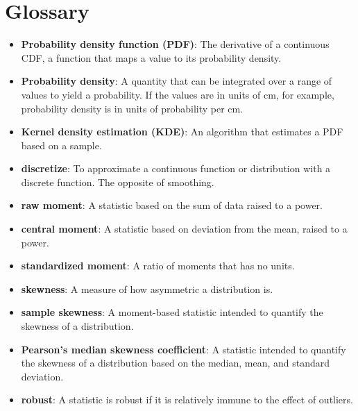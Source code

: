 \documentclass[12pt]{book}
\begin{document}
\section{Glossary}

\begin{itemize}

\item {\bf Probability density function (PDF)}: The derivative of a continuous CDF,
a function that maps a value to its probability density.

\item {\bf Probability density}: A quantity that can be integrated over a
  range of values to yield a probability.  If the values are in units
  of cm, for example, probability density is in units of probability
  per cm.

\item {\bf Kernel density estimation (KDE)}: An algorithm that estimates a PDF
based on a sample.

\item {\bf discretize}: To approximate a continuous function or distribution
with a discrete function.  The opposite of smoothing.

\item {\bf raw moment}: A statistic based on the sum of data raised to a power.

\item {\bf central moment}: A statistic based on deviation from the mean,
raised to a power.

\item {\bf standardized moment}: A ratio of moments that has no units.

\item {\bf skewness}: A measure of how asymmetric a distribution is.

\item {\bf sample skewness}: A moment-based statistic intended to quantify
the skewness of a distribution.

\item {\bf Pearson's median skewness coefficient}: A statistic intended to
  quantify the skewness of a distribution based on the median, mean,
  and standard deviation.

\item {\bf robust}: A statistic is robust if it is relatively immune to the
  effect of outliers.

\end{itemize}
\end{document}
